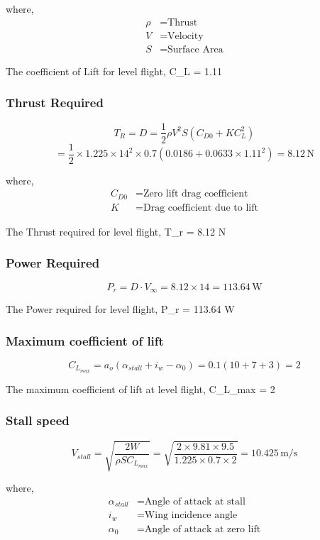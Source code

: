 \documentclass[12 pt]{article}
\begin{document}
{{where,
\begin{align*}
\rho & = \text{Thrust} \\
V & = \text{Velocity} \\
S & = \text{Surface Area} 
\end{align*}

The coefficient of Lift for level flight, C_{L} = 1.11

\subsubsection{Thrust Required}

\[ T_R = D = \frac{1}{2} \rho V^2 S(C_{D0} + K C_L^2) \] 
\[= \frac{1}{2} \times 1.225 \times 14^2 \times 0.7(0.0186 + 0.0633\times1.11^2) = 8.12 \, \text{N} \]

where,
\begin{align*}
C_{D0}  & = \text{Zero lift drag coefficient} \\
K & = \text{Drag coefficient due to lift}
\end{align*}

The Thrust required for level flight, T_{r} = 8.12 N

\subsubsection{Power Required}

\[ P_r = D \cdot V_{\infty} = 8.12 \times 14 = 113.64 \, \text{W} \]

The Power required for level flight, P_{r} = 113.64 W

\subsubsection{Maximum coefficient of lift}
\[ C_{L_{max}} = a_o(\alpha_{stall} + i_w - \alpha_0) = 0.1(10 + 7 + 3) = 2 \]

The maximum coefficient of lift at level flight, C_{L_{max}} = 2

\subsubsection{Stall speed}
\[ V_{stall} = \sqrt{\frac{2W}{\rho S C_{L_{max}}}} = \sqrt{\frac{2 \times 9.81 \times 9.5}{1.225 \times 0.7 \times 2}} = 10.425 \, \text{m/s} \]

where,
\begin{align*}
\alpha_{stall}  & = \text{Angle of attack at stall} \\
i_w & = \text{Wing incidence angle} \\
\alpha_0 & = \text{Angle of attack at zero lift}
\end{align*}

}}
\end{document}
